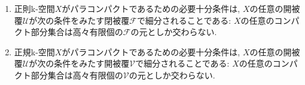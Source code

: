 \documentclass[uplatex, dvipdfmx, a4paper, 12pt, class=jsarticle, crop=false]{standalone}
\begin{document}
\begin{problem}[5.1.B]\label{eng-5-1-B-problem}
    \begin{enumerate}
        \item {}正則k-空間\(X\)がパラコンパクトであるための必要十分条件は,
        \(X\)の任意の開被覆\(\mathscr{U}\)が次の条件をみたす閉被覆\(\mathscr{F}\)で細分されることである:
        \(X\)の任意のコンパクト部分集合は高々有限個の\(\mathscr{F}\)の元としか交わらない.

        \item {}正規k-空間\(X\)がパラコンパクトであるための必要十分条件は,
        \(X\)の任意の開被覆\(\mathscr{U}\)が次の条件をみたす開被覆\(\mathscr{V}\)で細分されることである:
        \(X\)の任意のコンパクト部分集合は高々有限個の\(\mathscr{V}\)の元としか交わらない.
    \end{enumerate}
\end{problem}
\end{document}
